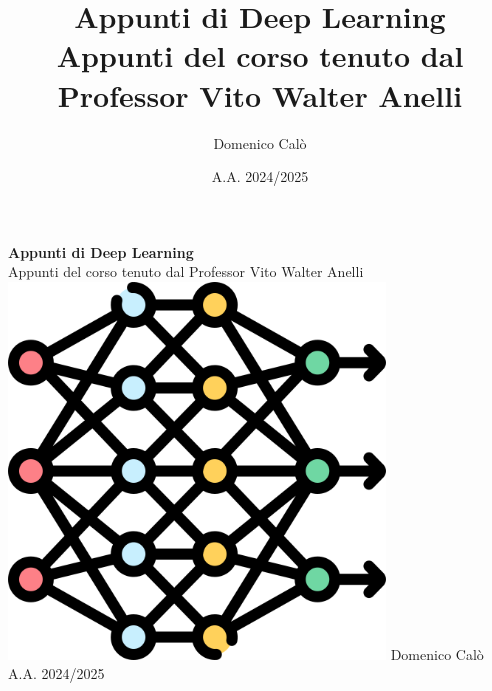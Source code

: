 \documentclass[a4paper,12pt]{book} %
\title{\textbf{Appunti di Deep Learning}\\
    \vspace{0.5cm}
    {\LARGE Appunti del corso tenuto dal Professor Vito Walter Anelli}}
\author{Domenico Calò}
\date{A.A. 2024/2025}
\begin{document}
\begin{titlepage}
    \begin{center}
        \vspace*{2cm}
        {\Huge \textbf{Appunti di Deep Learning}}\\
        \vspace{0.5cm}
        {\LARGE Appunti del corso tenuto dal Professor Vito Walter Anelli}
        \vfill
        \includegraphics[width=0.75\textwidth]{figure/dlogo.png}
        \vfill
        {\Large Domenico Calò}\\
        \vspace{0.5cm}
        {\large A.A. 2024/2025}
        \vspace*{2cm}
    \end{center}
\end{titlepage}


\tableofcontents
\listoffigures
\listoftables
\newpage





















\printbibliography
\end{document}
